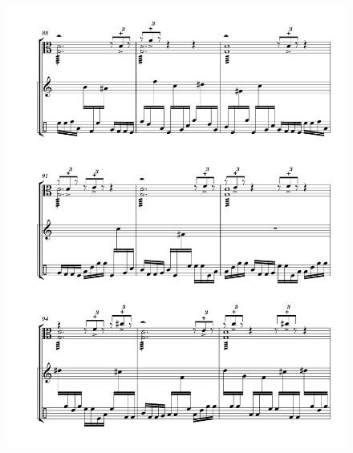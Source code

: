 \begin{figure}[htbp]
    \centering
	\includegraphics[width=6.5in]{figures/Viola_Percussion_13.pdf}
\end{figure}

